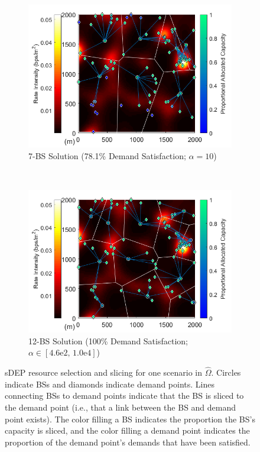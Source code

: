 \documentclass[12pt,dvipsnames]{report}
\newcommand{\expnumber}[2]{{#1}\mathrm{e}{#2}}
\begin{document}
\begin{figure}[p]
	\centering
	\begin{subfigure}{.7\textwidth}
		\centering
		\includegraphics[width=1\linewidth]{Figures/Prelim_VoronoiDemandAllocation_sDEP_7BS_snip2}
		\caption{\small 7-BS Solution (78.1\% Demand Satisfaction; $\alpha = 10$)}
		\label{fig:Prelim_VorDemAlloc_sDEP7}
	\end{subfigure} \\
	\begin{subfigure}{.7\textwidth}
		\centering
		\includegraphics[width=1\linewidth]{Figures/Prelim_VoronoiDemandAllocation_sDEP_12BS_snip2}
		\caption{\small 12-BS Solution (100\% Demand Satisfaction; $\alpha \in \left[ \expnumber{4.6}{2},\, \expnumber{1.0}{4} \right]$)}
		\label{fig:Prelim_VorDemAlloc_sDEP12}
	\end{subfigure}
	\caption[One preliminary simulations sDEP resource selection and slicing solution]{sDEP resource selection and slicing for one scenario in $\hat{\Omega}$.  Circles indicate BSs and diamonds indicate demand points.  Lines connecting BSs to demand points indicate that the BS is sliced to the demand point (i.e., that a link between the BS and demand point exists).  The color filling a BS indicates the proportion the BS's capacity is sliced, and the color filling a demand point indicates the proportion of the demand point's demands that have been satisfied.}
	\label{fig:Prelim_VorDemAlloc_sDEP}
\end{figure}
\end{document}
